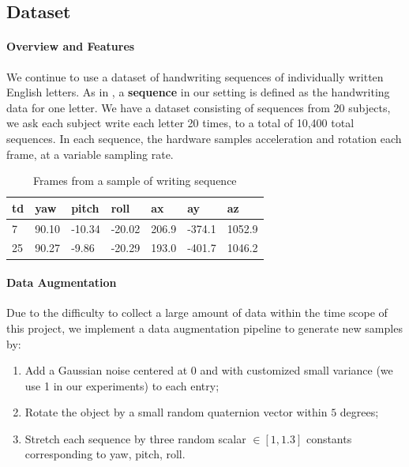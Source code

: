 \documentclass{article}
\begin{document}
\begin{multicols*}{2}
\section{Dataset}

\paragraph{Overview and Features} We continue to use a dataset of handwriting sequences of individually written English letters. As in \cite{ours}, a \textbf{sequence} in our setting is defined as the handwriting data for one letter. We have a dataset consisting of sequences from 20 subjects, we ask each subject write each letter 20 times, to a total of 10,400 total sequences. In each sequence, the hardware samples acceleration and rotation each frame, at a variable sampling rate. 


\begin{table}[H]
\centering
\begin{tabular}{lllllll}
\hline
td & yaw    & pitch  & roll   & ax     & ay      & az      \\ \hline
7  & 90.10 & -10.34 & -20.02 & 206.9 & -374.1 & 1052.9 \\
25 & 90.27  & -9.86  & -20.29 & 193.0 & -401.7 & 1046.2 \\ \hline
\end{tabular}
\vspace{3pt}
\caption{Frames from a sample of writing sequence}
\label{tab:sample-sequence}
\end{table}
\vspace{-10px}

\paragraph{Data Augmentation}
Due to the difficulty to collect a large amount of data within the time scope of this project, we implement a data augmentation pipeline to generate new samples by:
\begin{enumerate}
    \item Add a Gaussian noise centered at 0 and with customized small variance (we use 1 in our experiments) to each entry;
    \item Rotate the object by a small random quaternion vector  within $5$ degrees;
    \item Stretch each sequence by three random scalar $\in [1, 1.3]$ constants corresponding to yaw, pitch, roll.
\end{enumerate}


\end{multicols*}
\end{document}
